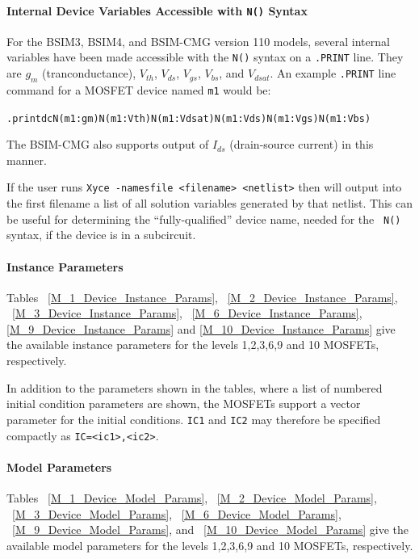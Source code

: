 \paragraph{Internal Device Variables Accessible with {\tt N()} Syntax}
For the BSIM3, BSIM4, and BSIM-CMG version 110 models, several
internal variables have been made accessible with the {\tt N()} syntax
on a {\tt .PRINT} line.  They are $g_{m}$ (tranconductance), $V_{th}$,
$V_{ds}$, $V_{gs}$, $V_{bs}$, and $V_{dsat}$.  An example {\tt .PRINT}
line command for a MOSFET device named {\tt m1} would be:
\begin{alltt}
.print dc N(m1:gm) N(m1:Vth) N(m1:Vdsat) N(m1:Vds) N(m1:Vgs) N(m1:Vbs)
\end{alltt}
The BSIM-CMG also supports output of $I_{ds}$ (drain-source current)
in this manner.

If the user runs \texttt{Xyce -namesfile <filename> <netlist>} then
\Xyce{} will output into the first filename a list of all solution
variables generated by that netlist. This can be useful for
determining the ``fully-qualified'' device name, needed for the {\tt
  N()} syntax, if the device is in a subcircuit.

\paragraph{Instance Parameters}
Tables ~\ref{M_1_Device_Instance_Params}, ~\ref{M_2_Device_Instance_Params}, 
~\ref{M_3_Device_Instance_Params},  ~\ref{M_6_Device_Instance_Params},
\ref{M_9_Device_Instance_Params} and \ref{M_10_Device_Instance_Params}  
give the available instance parameters for the levels 1,2,3,6,9 and 10 MOSFETs,
respectively.

In addition to the parameters shown in the tables, where a list of
numbered initial condition parameters are shown, the MOSFETs support a vector
parameter for the initial conditions.  \texttt{IC1} and \texttt{IC2}
may therefore be specified compactly as \texttt{IC=<ic1>,<ic2>}.

\paragraph{Model Parameters}
Tables ~\ref{M_1_Device_Model_Params}, ~\ref{M_2_Device_Model_Params},
~\ref{M_3_Device_Model_Params}, ~\ref{M_6_Device_Model_Params},
~\ref{M_9_Device_Model_Params}, and ~\ref{M_10_Device_Model_Params}
give the available model parameters for the levels 1,2,3,6,9 and 10 MOSFETs,
respectively.

